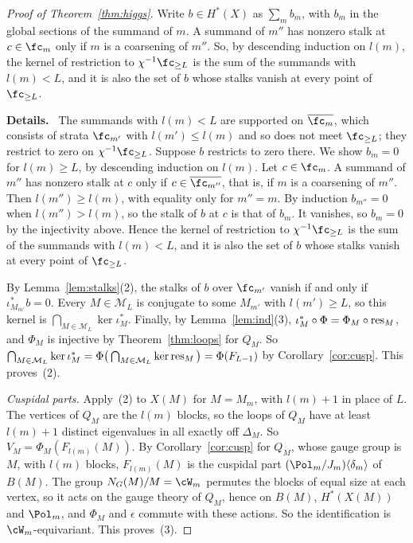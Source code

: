 \documentclass[11pt]{amsart}
\newenvironment{details}{\par\color{black!60!green}\noindent\textbf{Details.}\ }{\par}
\begin{document}
\begin{proof}[Proof of Theorem~\ref{thm:higgs}]
Write $b\in H^*(X)$ as $\sum_mb_m$, with $b_m$ in the global sections of the
summand of $m$.  A summand of $m''$ has nonzero stalk at $c\in\fc_m$ only if
$m$ is a coarsening of $m''$.  So, by descending induction on $l(m)$, the
kernel of restriction to $\chi^{-1}\fc_{\ge L}$ is the sum of the summands
with $l(m)<L$, and it is also the set of $b$ whose stalks vanish at every
point of $\fc_{\ge L}$.
\begin{details}
The summands with $l(m)<L$ are supported on
$\overline{\fc_m}$, which consists of strata $\fc_{m'}$ with $l(m')\le l(m)$
and so does not meet $\fc_{\ge L}$; they restrict to zero on
$\chi^{-1}\fc_{\ge L}$.  Suppose $b$ restricts to zero there.  We show
$b_m=0$ for $l(m)\ge L$, by descending induction on $l(m)$.  Let $c\in\fc_m$.
A summand of $m''$ has nonzero stalk at $c$ only if $c\in\overline{\fc_{m''}}$,
that is, if $m$ is a coarsening of $m''$.  Then $l(m'')\ge l(m)$, with equality
only for $m''=m$.  By induction $b_{m''}=0$ when $l(m'')>l(m)$, so the stalk of
$b$ at $c$ is that of $b_m$.  It vanishes, so $b_m=0$ by the injectivity
above.  Hence the kernel of restriction to $\chi^{-1}\fc_{\ge L}$ is the sum
of the summands with $l(m)<L$, and it is also the set of $b$ whose stalks
vanish at every point of $\fc_{\ge L}$.
\end{details}
By Lemma~\ref{lem:stalks}(2), the
stalks of $b$ over $\fc_{m'}$ vanish if and only if $\iota_{M_{m'}}^*b=0$.
Every $M\in\mathcal M_L$ is conjugate to some $M_{m'}$ with $l(m')\ge L$, so
this kernel is $\bigcap_{M\in\mathcal M_L}\ker\iota_M^*$.  Finally, by
Lemma~\ref{lem:ind}(3), $\iota_M^*\circ\Phi=\Phi_M\circ\operatorname{res}_M$, and $\Phi_M$ is
injective by Theorem~\ref{thm:loops} for $Q_M$.  So
$\bigcap_{M\in\mathcal M_L}\ker\iota_M^*=\Phi\big(\bigcap_{M\in\mathcal
M_L}\ker\operatorname{res}_M\big)=\Phi(F_{L-1})$ by Corollary~\ref{cor:cusp}.  This
proves~(2).

\emph{Cuspidal parts.}  Apply~(2) to $X(M)$ for $M=M_m$, with $l(m)+1$ in
place of $L$.  The vertices of $Q_M$ are the $l(m)$ blocks, so the loops of
$Q_M$ have at least $l(m)+1$ distinct eigenvalues in all exactly off
$\Delta_M$.  So $V_M=\Phi_M(F_{l(m)}(M))$.  By Corollary~\ref{cor:cusp} for
$Q_M$, whose gauge group is $M$, with $l(m)$ blocks, $F_{l(m)}(M)$ is the
cuspidal part $(\Pol_m/J_m)\langle\delta_m\rangle$ of $B(M)$.  The group $N_G(M)/M=\cW_m$ permutes the blocks of
equal size at each vertex, so it acts on the gauge theory of $Q_M$, hence on
$B(M)$, $H^*(X(M))$ and $\Pol_m$, and $\Phi_M$ and $\epsilon$ commute with these
actions.  So the identification is $\cW_m$-equivariant.  This proves~(3).
\end{proof}
\end{document}
